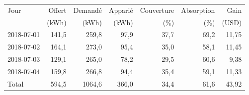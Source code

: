 \begin{tabular}{lrrrrrr}
\toprule
Jour & Offert & Demand\'e & Appari\'e & Couverture & Absorption & Gain \\
 & (kWh) & (kWh) & (kWh) & (\%) & (\%) & (USD) \\
\midrule
2018-07-01 & 141,5 & 259,8 & 97,9 & 37,7 & 69,2 & 11,75 \\
2018-07-02 & 164,1 & 273,0 & 95,4 & 35,0 & 58,1 & 11,45 \\
2018-07-03 & 129,1 & 265,0 & 78,2 & 29,5 & 60,6 & 9,38 \\
2018-07-04 & 159,8 & 266,8 & 94,4 & 35,4 & 59,1 & 11,33 \\
\midrule
Total & 594,5 & 1064,6 & 366,0 & 34,4 & 61,6 & 43,92 \\
\bottomrule
\end{tabular}